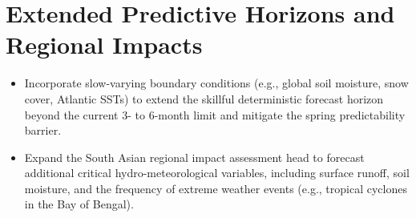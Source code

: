 \section{Extended Predictive Horizons and Regional Impacts}
\begin{itemize}
    \item Incorporate slow-varying boundary conditions (e.g., global soil moisture, snow cover, Atlantic SSTs) to extend the skillful deterministic forecast horizon beyond the current 3- to 6-month limit and mitigate the spring predictability barrier.
    \item Expand the South Asian regional impact assessment head to forecast additional critical hydro-meteorological variables, including surface runoff, soil moisture, and the frequency of extreme weather events (e.g., tropical cyclones in the Bay of Bengal).
\end{itemize}